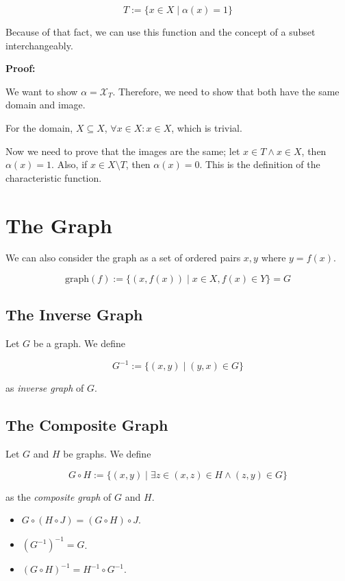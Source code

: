 \[
	T := \{x \in X \mid \alpha(x) = 1\}
\]

Because of that fact, we can use this function and the concept of a subset interchangeably.

\textbf{Proof:}

We want to show \(\alpha = \mathcal{X}_T\). Therefore, we need to show that both have the same domain and image.

For the domain, \(X \subseteq X\), \(\forall x \in X: x \in X\), which is trivial.

Now we need to prove that the images are the same; let \(x \in T \land x \in X\), then \(\alpha(x) = 1\).
Also, if \(x \in X \setminus T\), then \(\alpha(x) = 0\). This is the definition of the characteristic function.

\QED

\section{The Graph}

We can also consider the graph as a set of ordered pairs \(x, y\) where \(y = f(x)\).

\[
	\mathrm{graph}(f):= \{(x, f(x)) \mid x \in X, f(x) \in Y\} = G
\]

\subsection{The Inverse Graph}

Let \(G\) be a graph. We define

\[
	G^{-1} := \{(x,y) \mid (y, x) \in G\}
\]

as \emph{inverse graph} of \(G\).

\subsection{The Composite Graph}

Let \(G\) and \(H\) be graphs. We define

\[
	G \circ H := \{(x,y) \mid \exists z \in (x, z) \in H \land (z, y) \in G\}
\]

as the \emph{composite graph} of \(G\) and \(H\).

\begin{itemize}

	\item \(G \circ (H \circ J) = (G \circ H) \circ J\).

	\item \((G^{-1})^{-1} = G\).

	\item \((G \circ H)^{-1} = H^{-1} \circ G^{-1}\).

\end{itemize}

